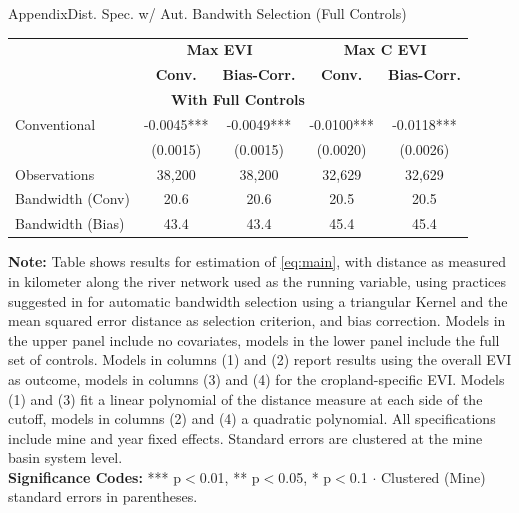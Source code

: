 \documentclass[aspectratio=169,11pt,dvipsnames, handout]{beamer}
\begin{document}

\begin{frame}{\textcolor{defaultclr!30}{Appendix}\hspace{0.75em}Dist. Spec. w/ Aut. Bandwith Selection (Full Controls)}
\centering
\begin{adjustbox}{width=0.8\textwidth}
\begin{tabular}{lcccc}
\toprule
& \multicolumn{2}{c}{\textbf{Max EVI}} & \multicolumn{2}{c}{\textbf{Max C EVI}} \\
\cmidrule(lr){2-3} \cmidrule(lr){4-5}
& \textbf{Conv.} & \textbf{Bias-Corr.} & \textbf{Conv.} & \textbf{Bias-Corr.} \\
\midrule
\multicolumn{5}{c}{\textbf{With Full Controls}} \\
\midrule
Conventional & -0.0045*** & -0.0049*** & -0.0100*** & -0.0118*** \\
& (0.0015) & (0.0015) & (0.0020) & (0.0026) \\
\midrule
Observations & 38,200 & 38,200 & 32,629 & 32,629 \\
Bandwidth (Conv) & 20.6 & 20.6 & 20.5 & 20.5 \\
Bandwidth (Bias) & 43.4 & 43.4 & 45.4 & 45.4 \\
\bottomrule
\end{tabular}
\end{adjustbox}

\vspace{3pt}

\scriptsize{
\textbf{Note:} Table shows results for estimation of \autoref{eq:main}, with distance as measured in kilometer along the river network used as the running variable, using practices suggested in \cite{cattaneo2019} for automatic bandwidth selection using a triangular Kernel and the mean squared error distance as selection criterion, and bias correction. Models in the upper panel include no covariates, models in the lower panel include the full set of controls. Models in columns (1) and (2) report results using the overall EVI as outcome, models in columns (3) and (4) for the cropland-specific EVI. Models (1) and (3) fit a linear polynomial of the distance measure at each side of the cutoff, models in columns (2) and (4) a quadratic polynomial. All specifications include mine and year fixed effects. Standard errors are clustered at the mine basin system level. \\
\textbf{Significance Codes:} *** p$<$0.01, ** p$<$0.05, * p$<$0.1 $\cdot$ Clustered (Mine) standard errors in parentheses.
}
\end{frame}
\end{document}
